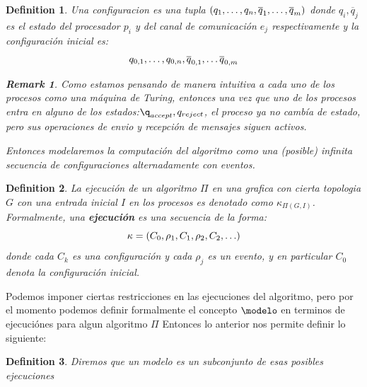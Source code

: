 \documentclass[10pt]{report}
\newtheorem*{remark}{Remark}
\newtheorem{definition}{Definition}
\begin{document}
    \begin{definition}
        Una configuracion es una tupla $(q_{1},\mathellipsis,q_{n},\overline{q}_{1},\mathellipsis,\overline{q}_{m})$
        donde $q_{i},\overline{q}_{j}$ es el estado del procesador $p_{i}$ y del canal de comunicación $e_{j}$ respectivamente
        y la configuración inicial es:
        \begin{equation}
        q_{0,1},\mathellipsis,q_{0,n},\overline{q}_{0,1},\mathellipsis \overline{q}_{0,m}\label{eq:equation5}
        \end{equation}
        \newline
        \begin{remark}
            Como estamos pensando de manera intuitiva a cada uno de los procesos como una máquina de Turing, entonces
            una vez que uno de los procesos entra en alguno de los estados:\space $\q_{accept},q_{reject}$, el proceso ya no cambía
            de estado, pero sus operaciones de envio y recepción de mensajes siguen activos.
        \end{remark}
        \newline
        Entonces modelaremos la computación del algoritmo como una (posible) infinita secuencia de configuraciones
        alternadamente con eventos.
    \end{definition}
    \theoremstyle{definition}
    \begin{definition}
        La ejecución de un algoritmo $\Pi$ en una grafica con cierta topologia
        $G$ con una entrada inicial $I$ en los procesos es denotado como $\kappa_{\Pi(G,I)}$.
        Formalmente, una \textbf{ejecución} es una secuencia de la forma:
        \begin{equation}
            \kappa = (C_{0},\rho_{1},C_{1},\rho_{2},C_{2},\mathellipsis)\label{eq:equation3}
        \end{equation}
        donde cada $C_{k}$ es una configuración y cada $\rho_{j}$ es un evento,
        y en particular $C_{0}$ denota la configuración inicial.
    \end{definition}
    Podemos imponer ciertas restricciones en las ejecuciones del algoritmo, pero por el momento
    podemos definir formalmente el concepto $\modelo$ en terminos de ejecuciónes para algun algoritmo
    $\Pi$\newline
    Entonces lo anterior nos permite definir lo siguiente:
    \begin{definition}
        Diremos que un modelo es un subconjunto de esas posibles ejecuciones
    \end{definition}
\end{document}
